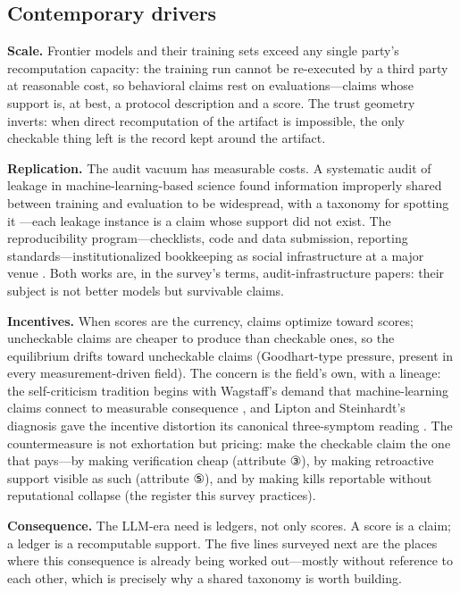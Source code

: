 \documentclass[11pt,a4paper]{article}
\begin{document}
\subsection{Contemporary drivers}

\textbf{Scale.} Frontier models and their training sets exceed any single party's recomputation capacity: the training run cannot be re-executed by a third party at reasonable cost, so behavioral claims rest on evaluations—claims whose support is, at best, a protocol description and a score. The trust geometry inverts: when direct recomputation of the artifact is impossible, the only checkable thing left is the record kept around the artifact.

\textbf{Replication.} The audit vacuum has measurable costs. A systematic audit of leakage in machine-learning-based science found information improperly shared between training and evaluation to be widespread, with a taxonomy for spotting it \cite{key07}—each leakage instance is a claim whose support did not exist. The reproducibility program—checklists, code and data submission, reporting standards—institutionalized bookkeeping as social infrastructure at a major venue \cite{key08}. Both works are, in the survey's terms, audit-infrastructure papers: their subject is not better models but survivable claims.

\textbf{Incentives.} When scores are the currency, claims optimize toward scores; uncheckable claims are cheaper to produce than checkable ones, so the equilibrium drifts toward uncheckable claims (Goodhart-type pressure, present in every measurement-driven field). The concern is the field's own, with a lineage: the self-criticism tradition begins with Wagstaff's demand that machine-learning claims connect to measurable consequence \cite{key25}, and Lipton and Steinhardt's diagnosis gave the incentive distortion its canonical three-symptom reading \cite{key26}. The countermeasure is not exhortation but pricing: make the checkable claim the one that pays—by making verification cheap (attribute ③), by making retroactive support visible as such (attribute ⑤), and by making kills reportable without reputational collapse (the register this survey practices).

\textbf{Consequence.} The LLM-era need is ledgers, not only scores. A score is a claim; a ledger is a recomputable support. The five lines surveyed next are the places where this consequence is already being worked out—mostly without reference to each other, which is precisely why a shared taxonomy is worth building.
\end{document}
